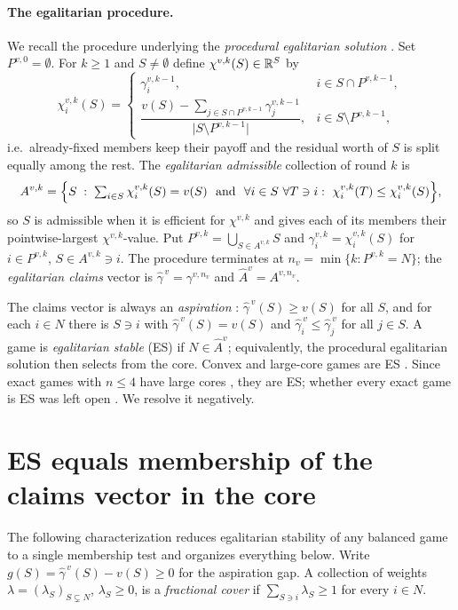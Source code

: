\paragraph{The egalitarian procedure.}
We recall the procedure underlying the \emph{procedural egalitarian solution}
\citep{DBH2017,Dietzenbacher2021}. Set $P^{v,0}=\emptyset$. For $k\ge1$ and
$S\neq\emptyset$ define $\chi^{v,k}(S)\in\mathbb{R}^{S}$ by
\[
  \chi^{v,k}_i(S)=
  \begin{cases}
    \gamma^{v,k-1}_i, & i\in S\cap P^{v,k-1},\\[4pt]
    \dfrac{v(S)-\sum_{j\in S\cap P^{v,k-1}}\gamma^{v,k-1}_j}
          {\lvert S\setminus P^{v,k-1}\rvert}, & i\in S\setminus P^{v,k-1},
  \end{cases}
\]
i.e.\ already-fixed members keep their payoff and the residual worth of $S$ is
split equally among the rest. The \emph{egalitarian admissible} collection of
round $k$ is
\[
  A^{v,k}=\Bigl\{S\;:\;\textstyle\sum_{i\in S}\chi^{v,k}_i(S)=v(S)\ \text{ and }\
  \forall i\in S\ \forall T\ni i:\ \chi^{v,k}_i(T)\le\chi^{v,k}_i(S)\Bigr\},
\]
so $S$ is admissible when it is efficient for $\chi^{v,k}$ and gives each of its
members their pointwise-largest $\chi^{v,k}$-value. Put
$P^{v,k}=\bigcup_{S\in A^{v,k}}S$ and $\gamma^{v,k}_i=\chi^{v,k}_i(S)$ for
$i\in P^{v,k}$, $S\in A^{v,k}\ni i$. The procedure terminates at
$n_v=\min\{k:P^{v,k}=N\}$; the \emph{egalitarian claims} vector is
$\widehat\gamma^{\,v}=\gamma^{v,n_v}$ and $\widehat A^{v}=A^{v,n_v}$.

The claims vector is always an \emph{aspiration} \citep{Bennett1983}:
$\widehat\gamma^{\,v}(S)\ge v(S)$ for all $S$, and for each $i\in N$ there is
$S\ni i$ with $\widehat\gamma^{\,v}(S)=v(S)$ and
$\widehat\gamma^{\,v}_i\le\widehat\gamma^{\,v}_j$ for all $j\in S$. A game is
\emph{egalitarian stable} (ES) if $N\in\widehat A^{v}$; equivalently, the
procedural egalitarian solution then selects from the core. Convex and
large-core games are ES \citep{Dietzenbacher2021}. Since exact games with
$n\le4$ have large cores \citep{Biswas1999}, they are ES; whether every exact
game is ES was left open \citep[][Sec.~4]{Dietzenbacher2021}. We resolve it
negatively.


\section{ES equals membership of the claims vector in the core}\label{sec:lemma1}

The following characterization reduces egalitarian stability of any balanced
game to a single membership test and organizes everything below. Write
$g(S)=\widehat\gamma^{\,v}(S)-v(S)\ge 0$ for the aspiration gap. A collection of
weights $\lambda=(\lambda_S)_{S\subsetneq N}$, $\lambda_S\ge0$, is a
\emph{fractional cover} if $\sum_{S\ni i}\lambda_S\ge1$ for every $i\in N$.

